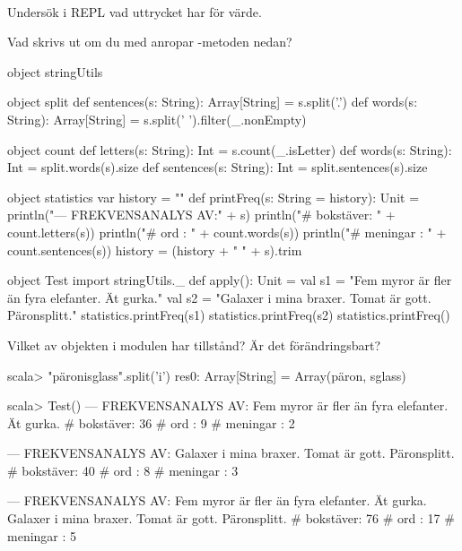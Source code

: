 \clearpage

\ExtraTasks %




\QUESTBEGIN

\Task  \what~

\Subtask Undersök i REPL vad uttrycket  har för värde.

\Subtask Vad skrivs ut om du med  anropar -metoden nedan?
\begin{Code}
object stringUtils {
  object split {
    def sentences(s: String): Array[String] = s.split('.')
    def words(s: String):     Array[String] = s.split(' ').filter(_.nonEmpty)
  }

  object count {
    def letters(s: String):   Int = s.count(_.isLetter)
    def words(s: String):     Int = split.words(s).size
    def sentences(s: String): Int = split.sentences(s).size
  }

  object statistics {
    var history = ""
    def printFreq(s: String = history): Unit = {
      println("\n--- FREKVENSANALYS AV:\n" + s)
      println("# bokstäver: " + count.letters(s))
      println("# ord      : " + count.words(s))
      println("# meningar : " + count.sentences(s))
      history = (history + " " + s).trim
    }
  }
}

object Test {
  import stringUtils._
  def apply(): Unit = {
    val s1 = "Fem     myror är fler än fyra elefanter. Ät gurka."
    val s2 = "Galaxer i mina braxer. Tomat är gott. Päronsplitt."
    statistics.printFreq(s1)
    statistics.printFreq(s2)
    statistics.printFreq()
  }
}
\end{Code}

\Subtask Vilket av objekten i modulen  har tillstånd? Är det förändringsbart?


\SOLUTION


\TaskSolved \what

\SubtaskSolved
\begin{REPLnonum}
scala> "päronisglass".split('i')
res0: Array[String] = Array(päron, sglass)
\end{REPLnonum}

\SubtaskSolved
\begin{REPLnonum}
scala> Test()
--- FREKVENSANALYS AV:
Fem     myror är fler än fyra elefanter. Ät gurka.
# bokstäver: 36
# ord      : 9
# meningar : 2

--- FREKVENSANALYS AV:
Galaxer i mina braxer. Tomat är gott. Päronsplitt.
# bokstäver: 40
# ord      : 8
# meningar : 3

--- FREKVENSANALYS AV:
Fem     myror är fler än fyra elefanter. Ät gurka. Galaxer i mina braxer. Tomat
är gott. Päronsplitt.
# bokstäver: 76
# ord      : 17
# meningar : 5
\end{REPLnonum}

